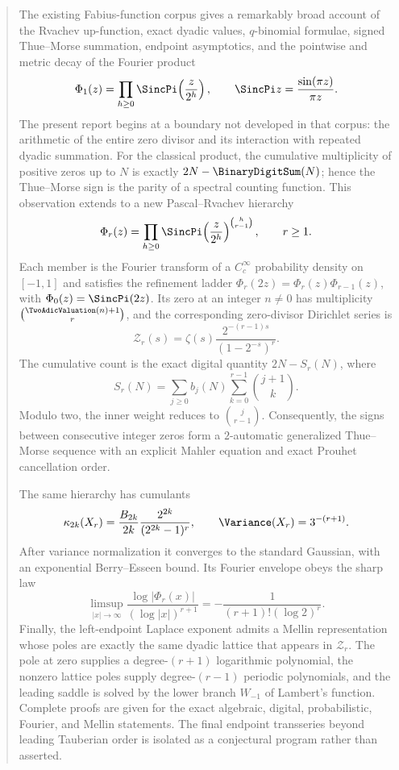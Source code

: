 \documentclass[11pt,oneside]{article}
\theoremstyle{definition}
\theoremstyle{remark}
\begin{document}
\hypersetup{pageanchor=false}


\hypersetup{pageanchor=true}

\begin{abstract}
The existing Fabius-function corpus gives a remarkably broad account of the Rvachev up-function, exact dyadic values, $q$-binomial formulae, signed Thue--Morse summation, endpoint asymptotics, and the pointwise and metric decay of the Fourier product \cite{p3:aistleitner-hofer-larcher}
\[
  \Phi_1(z)=\prod_{h\ge 0}\SincPi\!\left(\frac{z}{2^h}\right),
  \qquad \SincPi z=\frac{\sin(\pi z)}{\pi z}.
\]
The present report begins at a boundary not developed in that corpus: the arithmetic of the entire zero divisor and its interaction with repeated dyadic summation.  For the classical product, the cumulative multiplicity of positive zeros up to $N$ is exactly $2N-\BinaryDigitSum(N)$; hence the Thue--Morse sign is the parity of a spectral counting function.  This observation extends to a new Pascal--Rvachev hierarchy
\[
  \Phi_r(z)=\prod_{h\ge0}\SincPi\!\left(\frac z{2^h}\right)^{\binom h{r-1}},
  \qquad r\ge1.
\]
Each member is the Fourier transform of a $C_c^\infty$ probability density on $[-1,1]$ and satisfies the refinement ladder $\Phi_r(2z)=\Phi_r(z)\Phi_{r-1}(z)$, with $\Phi_0(z)=\SincPi(2z)$.  Its zero at an integer $n\ne0$ has multiplicity $\binom{\TwoAdicValuation(n)+1}{r}$, and the corresponding zero-divisor Dirichlet series is
\[
  \mathcal Z_r(s)=\zeta(s)\frac{2^{-(r-1)s}}{(1-2^{-s})^r}.
\]
The cumulative count is the exact digital quantity $2N-S_r(N)$, where
\[
 S_r(N)=\sum_{j\ge0}b_j(N)\sum_{k=0}^{r-1}\binom{j+1}{k}.
\]
Modulo two, the inner weight reduces to $\binom j{r-1}$.  Consequently, the signs between consecutive integer zeros form a $2$-automatic generalized Thue--Morse sequence with an explicit Mahler equation and exact Prouhet cancellation order.

The same hierarchy has cumulants
\[
 \kappa_{2k}(X_r)=\frac{B_{2k}}{2k}\frac{2^{2k}}{(2^{2k}-1)^r},
 \qquad \Variance(X_r)=3^{-(r+1)}.
\]
After variance normalization it converges to the standard Gaussian, with an exponential Berry--Esseen bound.  Its Fourier envelope obeys the sharp law
\[
 \limsup_{|x|\to\infty}\frac{\log|\Phi_r(x)|}{(\log|x|)^{r+1}}
 =-\frac{1}{(r+1)!(\log2)^r}.
\]
Finally, the left-endpoint Laplace exponent admits a Mellin representation whose poles are exactly the same dyadic lattice that appears in $\mathcal Z_r$.  The pole at zero supplies a degree-$(r+1)$ logarithmic polynomial, the nonzero lattice poles supply degree-$(r-1)$ periodic polynomials, and the leading saddle is solved by the lower branch $W_{-1}$ of Lambert's function.  Complete proofs are given for the exact algebraic, digital, probabilistic, Fourier, and Mellin statements.  The final endpoint transseries beyond leading Tauberian order is isolated as a conjectural program rather than asserted.
\end{abstract}
\end{document}
